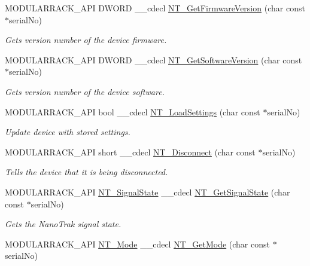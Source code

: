 \begin{DoxyCompactItemize}
M\+O\+D\+U\+L\+A\+R\+R\+A\+C\+K\+\_\+\+A\+PI D\+W\+O\+RD \+\_\+\+\_\+cdecl \hyperlink{group___modular_nano_trak_ga11c198ac5c0bccf2b6334e7be196a74d}{N\+T\+\_\+\+Get\+Firmware\+Version} (char const $\ast$serial\+No)
\begin{DoxyCompactList}\small\item\em Gets version number of the device firmware. \end{DoxyCompactList}\item 
M\+O\+D\+U\+L\+A\+R\+R\+A\+C\+K\+\_\+\+A\+PI D\+W\+O\+RD \+\_\+\+\_\+cdecl \hyperlink{group___modular_nano_trak_ga0e3c2e6d2fb9e1acd807966c9ee40092}{N\+T\+\_\+\+Get\+Software\+Version} (char const $\ast$serial\+No)
\begin{DoxyCompactList}\small\item\em Gets version number of the device software. \end{DoxyCompactList}\item 
M\+O\+D\+U\+L\+A\+R\+R\+A\+C\+K\+\_\+\+A\+PI bool \+\_\+\+\_\+cdecl \hyperlink{group___modular_nano_trak_ga62be5cbddd185ed607f7ce1a3a3a6de9}{N\+T\+\_\+\+Load\+Settings} (char const $\ast$serial\+No)
\begin{DoxyCompactList}\small\item\em Update device with stored settings. \end{DoxyCompactList}\item 
M\+O\+D\+U\+L\+A\+R\+R\+A\+C\+K\+\_\+\+A\+PI short \+\_\+\+\_\+cdecl \hyperlink{group___modular_nano_trak_gaa4a65bda930f3673ba6e7081121b4b93}{N\+T\+\_\+\+Disconnect} (char const $\ast$serial\+No)
\begin{DoxyCompactList}\small\item\em Tells the device that it is being disconnected. \end{DoxyCompactList}\item 
M\+O\+D\+U\+L\+A\+R\+R\+A\+C\+K\+\_\+\+A\+PI \hyperlink{group___common_gadf51b72fa3ebcc93399ffb3ea30cbf66}{N\+T\+\_\+\+Signal\+State} \+\_\+\+\_\+cdecl \hyperlink{group___modular_nano_trak_ga9bd42fa3fde2b0d09a8ebfd518892527}{N\+T\+\_\+\+Get\+Signal\+State} (char const $\ast$serial\+No)
\begin{DoxyCompactList}\small\item\em Gets the Nano\+Trak signal state. \end{DoxyCompactList}\item 
M\+O\+D\+U\+L\+A\+R\+R\+A\+C\+K\+\_\+\+A\+PI \hyperlink{group___common_gab868c9a5ae40544a9debc2e28cdef1a8}{N\+T\+\_\+\+Mode} \+\_\+\+\_\+cdecl \hyperlink{group___modular_nano_trak_ga80cc63553e2de1df27112ccf3ea1516b}{N\+T\+\_\+\+Get\+Mode} (char const $\ast$serial\+No)

\end{DoxyCompactItemize}
